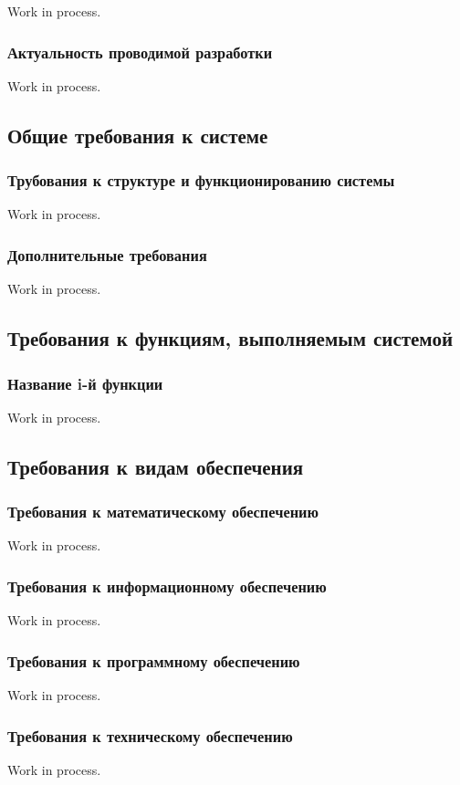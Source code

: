 Work in process.

\subsubsection{Актуальность проводимой разработки}

Work in process.

\subsection{Общие требования к системе}

\subsubsection{Трубования к структуре и функционированию системы}

Work in process.

\subsubsection{Дополнительные требования}

Work in process.

\subsection{Требования к функциям, выполняемым системой}

\subsubsection{Название i-й функции}

Work in process.

\subsection{Требования к видам обеспечения}

\subsubsection{Требования к математическому обеспечению}

Work in process.

\subsubsection{Требования к информационному обеспечению}

Work in process.

\subsubsection{Требования к программному обеспечению}

Work in process.

\subsubsection{Требования к техническому обеспечению}

Work in process.

\clearpage
\newpage